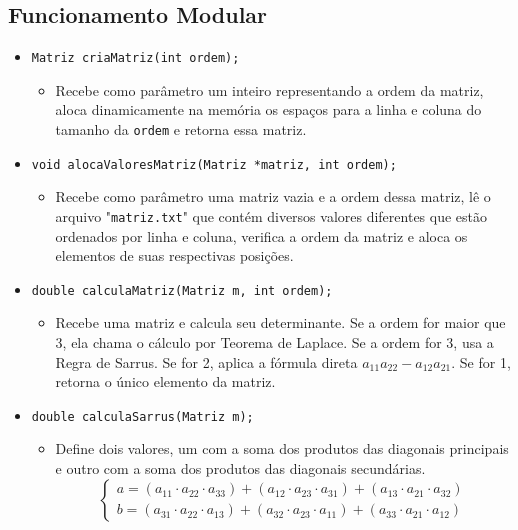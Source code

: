 \documentclass[12pt]{article}
\begin{document}
\subsection{Funcionamento Modular}
\begin{itemize}
    \item \verb|Matriz criaMatriz(int ordem);|
    \begin{itemize}
        \item Recebe como parâmetro um inteiro representando a ordem da matriz, 
        aloca dinamicamente na memória os espaços para a linha e coluna do 
        tamanho da \verb|ordem| e retorna essa matriz.
    \end{itemize}
    \item \verb|void alocaValoresMatriz(Matriz *matriz, int ordem);|
    \begin{itemize}
        \item Recebe como parâmetro uma matriz vazia e a ordem dessa matriz, lê 
        o arquivo "\verb|matriz.txt|" que contém diversos valores diferentes 
        que estão ordenados por linha e coluna, verifica a ordem da matriz e 
        aloca os elementos de suas respectivas posições.
    \end{itemize}
    \item \verb|double calculaMatriz(Matriz m, int ordem);|
    \begin{itemize}
        \item Recebe uma matriz e calcula seu determinante. Se a ordem for maior 
        que 3, ela chama o cálculo por Teorema de Laplace. Se a ordem for 3, 
        usa a Regra de Sarrus. Se for 2, aplica a fórmula direta $a_{11}a_{22} - 
        a_{12}a_{21}$. Se for 1, retorna o único elemento da matriz.
    \end{itemize}
    \item \verb|double calculaSarrus(Matriz m);|
    \begin{itemize}
        \item Define dois valores, um com a soma dos produtos das diagonais 
        principais e outro com a soma dos produtos das diagonais secundárias.
        \[
        \left\{
        \begin{array}{l}
        a = (a_{11} \cdot a_{22} \cdot a_{33}) + (a_{12} \cdot a_{23} \cdot 
        a_{31}) + (a_{13} \cdot a_{21} \cdot a_{32}) \\
        b = (a_{31} \cdot a_{22} \cdot a_{13}) + (a_{32} \cdot a_{23} \cdot 
        a_{11}) + (a_{33} \cdot a_{21} \cdot a_{12})
        \end{array}
\]
\end{itemize}
\end{itemize}
\end{document}
